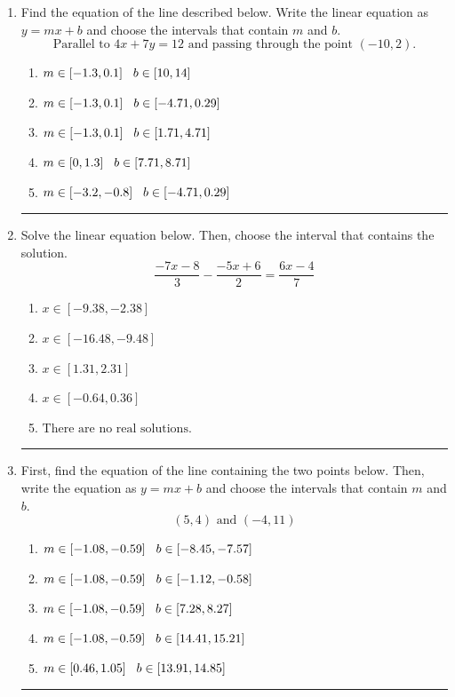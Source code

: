 \documentclass[14pt]{extbook}
\newcommand{\litem}[1]{\item#1\hspace*{-1cm}\rule{\textwidth}{0.4pt}}
\begin{document}
\begin{enumerate}
{\begin{enumerate}[label=\Alph*.]
\end{enumerate} }
\litem{
Find the equation of the line described below. Write the linear equation as $ y=mx+b $ and choose the intervals that contain $m$ and $b$.\[ \text{Parallel to } 4 x + 7 y = 12 \text{ and passing through the point } (-10, 2). \]\begin{enumerate}[label=\Alph*.]
\item \( m \in [-1.3, 0.1] \hspace*{3mm} b \in [10, 14] \)
\item \( m \in [-1.3, 0.1] \hspace*{3mm} b \in [-4.71, 0.29] \)
\item \( m \in [-1.3, 0.1] \hspace*{3mm} b \in [1.71, 4.71] \)
\item \( m \in [0, 1.3] \hspace*{3mm} b \in [7.71, 8.71] \)
\item \( m \in [-3.2, -0.8] \hspace*{3mm} b \in [-4.71, 0.29] \)

\end{enumerate} }
\litem{
Solve the linear equation below. Then, choose the interval that contains the solution.\[ \frac{-7x -8}{3} - \frac{-5x + 6}{2} = \frac{6x -4}{7} \]\begin{enumerate}[label=\Alph*.]
\item \( x \in [-9.38, -2.38] \)
\item \( x \in [-16.48, -9.48] \)
\item \( x \in [1.31, 2.31] \)
\item \( x \in [-0.64, 0.36] \)
\item \( \text{There are no real solutions.} \)

\end{enumerate} }
\litem{
First, find the equation of the line containing the two points below. Then, write the equation as $ y=mx+b $ and choose the intervals that contain $m$ and $b$.\[ (5, 4) \text{ and } (-4, 11) \]\begin{enumerate}[label=\Alph*.]
\item \( m \in [-1.08, -0.59] \hspace*{3mm} b \in [-8.45, -7.57] \)
\item \( m \in [-1.08, -0.59] \hspace*{3mm} b \in [-1.12, -0.58] \)
\item \( m \in [-1.08, -0.59] \hspace*{3mm} b \in [7.28, 8.27] \)
\item \( m \in [-1.08, -0.59] \hspace*{3mm} b \in [14.41, 15.21] \)
\item \( m \in [0.46, 1.05] \hspace*{3mm} b \in [13.91, 14.85] \)

\end{enumerate} }
\end{enumerate}
\end{document}
